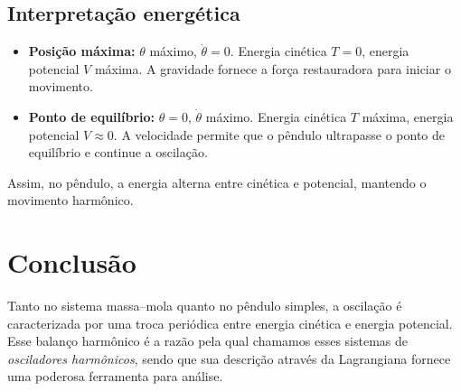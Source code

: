 \documentclass[12pt,a4paper]{article}
\begin{document}
\subsection*{Interpretação energética}

\begin{itemize}
    \item \textbf{Posição máxima:} \(\theta\) máximo, \(\dot{\theta} = 0\).  
    Energia cinética \(T = 0\), energia potencial \(V\) máxima.  
    A gravidade fornece a força restauradora para iniciar o movimento.
    
    \item \textbf{Ponto de equilíbrio:} \(\theta = 0\), \(\dot{\theta}\) máximo.  
    Energia cinética \(T\) máxima, energia potencial \(V \approx 0\).  
    A velocidade permite que o pêndulo ultrapasse o ponto de equilíbrio e continue a oscilação.
\end{itemize}

Assim, no pêndulo, a energia alterna entre cinética e potencial, mantendo o movimento harmônico.

\section{Conclusão}

Tanto no sistema massa–mola quanto no pêndulo simples, a oscilação é caracterizada por uma troca periódica entre energia cinética e energia potencial.  
Esse balanço harmônico é a razão pela qual chamamos esses sistemas de \emph{osciladores harmônicos}, sendo que sua descrição através da Lagrangiana fornece uma poderosa ferramenta para análise.
\end{document}
